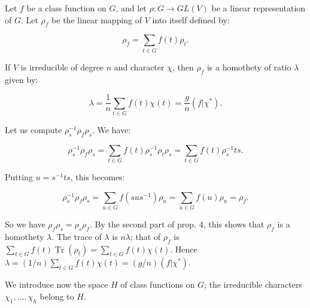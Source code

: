 Let $f$ be a class function on $G$, and let $\rho: G \rightarrow GL(V)$ be a linear representation of $G$. Let $\rho_f$ be the linear mapping of $V$ into itself defined by:

$$\rho_f = \sum_{t \in G} f(t)\rho_t.$$

If $V$ is irreducible of degree $n$ and character $\chi$, then $\rho_f$ is a homothety of ratio $\lambda$ given by:

$$\lambda = \frac{1}{n} \sum_{t \in G} f(t)\chi(t) = \frac{g}{n}(f|\chi^*).$$

Let us compute $\rho_s^{-1}\rho_f\rho_s$. We have:

$$\rho_s^{-1}\rho_f\rho_s = \sum_{t \in G} f(t)\rho_s^{-1}\rho_t\rho_s = \sum_{t \in G} f(t)\rho_s^{-1}ts.$$

Putting $u = s^{-1}ts$, this becomes:

$$\rho_s^{-1}\rho_f\rho_s = \sum_{u \in G} f(sus^{-1})\rho_u = \sum_{u \in G} f(u)\rho_u = \rho_f.$$

So we have $\rho_f\rho_s = \rho_s\rho_f$. By the second part of prop. 4, this shows that $\rho_f$ is a homothety $\lambda$. The trace of $\lambda$ is $n\lambda$; that of $\rho_f$ is $\sum_{t \in G} f(t)\operatorname{Tr}(\rho_t) = \sum_{t \in G} f(t)\chi(t)$. Hence $\lambda = (1/n) \sum_{t \in G} f(t)\chi(t) = (g/n)(f|\chi^*).$

We introduce now the space $H$ of class functions on $G$; the irreducible characters $\chi_1, \ldots, \chi_h$ belong to $H$.
